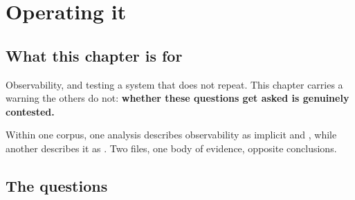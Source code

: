 \chapter{Operating it}
\label{ch:operating}

\section*{What this chapter is for}

Observability, and testing a system that does not repeat. This chapter carries
a warning the others do not: \textbf{whether these questions get asked is
genuinely contested.}

Within one corpus, one analysis describes observability as implicit and
, while
another describes it as . Two
files, one body of evidence, opposite conclusions.


\section*{The questions}

